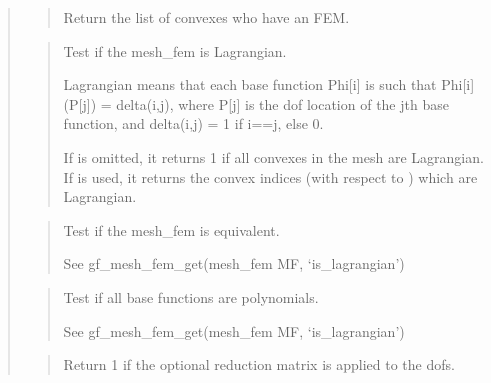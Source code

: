 \documentclass[a4paper,11pt,english]{sphinxmanual}
\begin{document}
\begin{quote}
\sphinxAtStartPar
{}
\begin{quote}

\sphinxAtStartPar
Return the list of convexes who have an FEM.
\end{quote}

\sphinxAtStartPar
{}
\begin{quote}

\sphinxAtStartPar
Test if the mesh\_fem is Lagrangian.

\sphinxAtStartPar
Lagrangian means that each base function Phi{[}i{]} is such that
Phi{[}i{]}(P{[}j{]}) = delta(i,j), where P{[}j{]} is the dof location of
the jth base function, and delta(i,j) = 1 if i==j, else 0.

\sphinxAtStartPar
If  is omitted, it returns 1 if all convexes in the mesh
are Lagrangian. If  is used, it returns the convex indices
(with respect to ) which are Lagrangian.
\end{quote}

\sphinxAtStartPar
{}
\begin{quote}

\sphinxAtStartPar
Test if the mesh\_fem is equivalent.

\sphinxAtStartPar
See gf\_mesh\_fem\_get(mesh\_fem MF, ‘is\_lagrangian’)
\end{quote}

\sphinxAtStartPar
{}
\begin{quote}

\sphinxAtStartPar
Test if all base functions are polynomials.

\sphinxAtStartPar
See gf\_mesh\_fem\_get(mesh\_fem MF, ‘is\_lagrangian’)
\end{quote}

\sphinxAtStartPar
{}
\begin{quote}

\sphinxAtStartPar
Return 1 if the optional reduction matrix is applied to the dofs.
\end{quote}


\end{quote}
\end{document}
